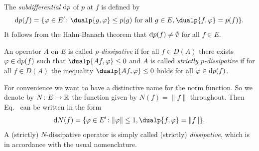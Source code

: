 The \emph{subdifferential} $\mathop{}\!\mathrm{d}{p}$ of\/ $p$ at $f$ is defined by
\begin{equation}\label{eq:a2-2.5}
\ddp(f) = \{\phi \in E' \colon \dualp{g,\phi} \leq p(g) \text{ for all } g \in E, \dualp{f,\phi} = p(f) \}.
\end{equation}
It follows from the Hahn-Banach theorem that $\mathop{}\!\mathrm{d}{p}(f) \neq \emptyset$ for all $f \in E$.
\begin{definition}\label{def:a2-2.1}
An operator $A$ on $E$ is called \emph{p-dissipative} if for all $f \in D(A)$ there exists $\phi \in \ddp(f)$ such that $\dualp{Af,\phi} \leq 0$ 
and $A$ is called \emph{strictly $p$-dissipative} if for all $f \in D(A)$ the inequality $\dualp{Af,\phi} \leq 0$ holds for all $\phi \in \ddp(f)$.
\end{definition}
For convenience we want to have a distinctive name for the norm function.
So we denote by $N \colon E \to \mathbb{R}$ the function given by $N(f) = \|f\|$ throughout.
Then Eq.~ can be written in the form
\begin{equation}\label{eq:a2-2.6}
\dN(f) = \{\phi \in E' \colon \|\phi\|\leq 1, \dualp{f,\phi} = \|f\|\}.
\end{equation}
A (strictly) $N$-dissipative operator is simply called (strictly) \emph{dissipative}, which is in accordance with the usual nomenclature.

